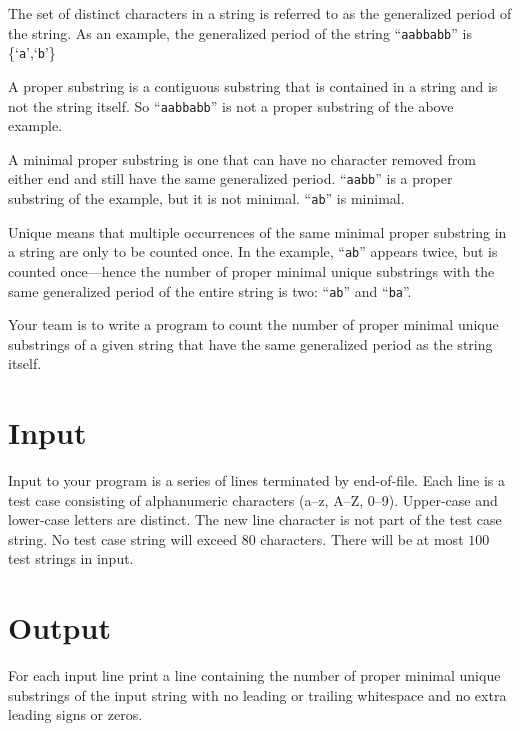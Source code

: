 
The set of distinct characters in a string is referred to as the
generalized period of the string.  As an example, the generalized period
of the string ``{\tt aabbabb}'' is \{`{\tt a}',`{\tt b}'\}
\par
A proper substring is a contiguous substring that is contained in
a string and is not the string itself. So ``{\tt aabbabb}'' is not a
proper substring of the above example.
\par
A minimal proper substring is one that can have no character removed from
either end and still have the same generalized period. ``{\tt aabb}''
is a proper substring of the example, but it is not minimal. ``{\tt ab}''
is minimal.
\par
Unique means that multiple occurrences of the same minimal proper
substring in a string are only to be counted once. In the example,
``{\tt ab}'' appears twice, but is counted once---hence the number of
proper minimal unique substrings with the same generalized period of
the entire string is two: ``{\tt ab}'' and ``{\tt ba}''.
\par
Your team is to write a program to count the number of proper minimal
unique substrings of a given string that have the same generalized
period as the string itself. 

\section*{Input}

Input to your program is a series of lines
terminated by end-of-file. Each line is a test case consisting of
alphanumeric characters (a--z, A--Z, 0--9).  Upper-case and lower-case
letters are distinct.  The new line character is not part of the test
case string.  No test case string will exceed $80$ characters. There
will be at most $100$ test strings in input.

\section*{Output}

For each input line print a line containing the number of proper minimal
unique substrings of the input string with no leading or trailing
whitespace and no extra leading signs or zeros.
